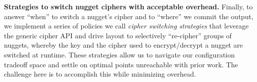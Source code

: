 \textbf{Strategies to switch nugget ciphers with acceptable overhead.} Finally,
to answer ``when'' to switch a nugget's cipher and to ``where'' we commit the
output, we implement a series of policies we call \textit{cipher switching
strategies} that leverage the generic cipher API and drive layout to selectively
``re-cipher'' groups of nuggets, whereby the key and the cipher used to
encrypt/decrypt a nugget are switched at runtime. These strategies allow us to
navigate our configuration tradeoff space and settle on optimal points
unreachable with prior work. The challenge here is to accomplish this while
minimizing overhead.

